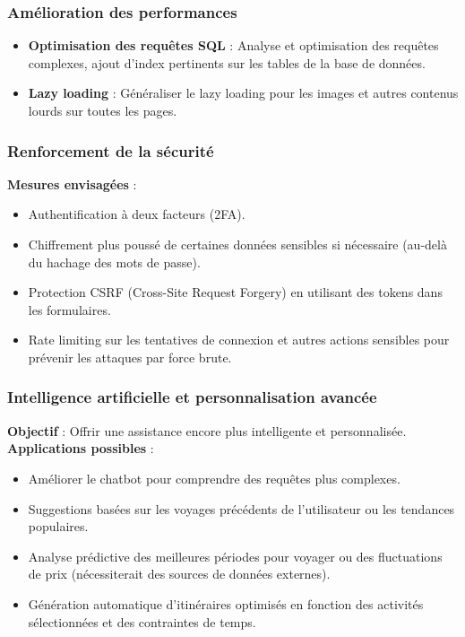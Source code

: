 \documentclass[a4paper,12pt]{article}
\begin{document}
\subsubsection{Amélioration des performances}
\begin{itemize}
  \item \textbf{Optimisation des requêtes SQL} : Analyse et optimisation des requêtes complexes, ajout d'index pertinents sur les tables de la base de données.
  \item \textbf{Lazy loading} : Généraliser le lazy loading pour les images et autres contenus lourds sur toutes les pages.

\end{itemize}
\subsubsection{Renforcement de la sécurité}
\textbf{Mesures envisagées} :
\begin{itemize}
  \item Authentification à deux facteurs (2FA).
  \item Chiffrement plus poussé de certaines données sensibles si nécessaire (au-delà du hachage des mots de passe).
  \item Protection CSRF (Cross-Site Request Forgery) en utilisant des tokens dans les formulaires.
  \item Rate limiting sur les tentatives de connexion et autres actions sensibles pour prévenir les attaques par force brute.
\end{itemize}

\subsubsection{Intelligence artificielle et personnalisation avancée}
\textbf{Objectif} : Offrir une assistance encore plus intelligente et personnalisée. \\
\textbf{Applications possibles} :
\begin{itemize}
  \item Améliorer le chatbot pour comprendre des requêtes plus complexes.
  \item Suggestions basées sur les voyages précédents de l'utilisateur ou les tendances populaires.
  \item Analyse prédictive des meilleures périodes pour voyager ou des fluctuations de prix (nécessiterait des sources de données externes).
  \item Génération automatique d'itinéraires optimisés en fonction des activités sélectionnées et des contraintes de temps.
\end{itemize}
\end{document}
